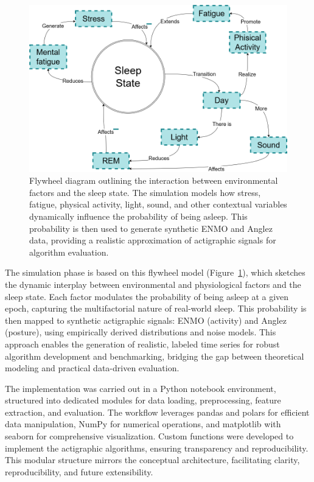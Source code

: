 \documentclass[conference]{IEEEtran}
\begin{document}
\begin{figure}[htbp]
	\centering
	\includegraphics[width=0.85\columnwidth]{simulation.png}
	\caption{Flywheel diagram outlining the interaction between environmental factors and the sleep state. The simulation models how stress, fatigue, physical activity, light, sound, and other contextual variables dynamically influence the probability of being asleep. This probability is then used to generate synthetic ENMO and Anglez data, providing a realistic approximation of actigraphic signals for algorithm evaluation.}
	\label{fig:flywheel_simulation}
\end{figure}

The simulation phase is based on this flywheel model (Figure~\ref{fig:flywheel_simulation}), which sketches the dynamic interplay between environmental and physiological factors and the sleep state. Each factor modulates the probability of being asleep at a given epoch, capturing the multifactorial nature of real-world sleep. This probability is then mapped to synthetic actigraphic signals: ENMO (activity) and Anglez (posture), using empirically derived distributions and noise models. This approach enables the generation of realistic, labeled time series for robust algorithm development and benchmarking, bridging the gap between theoretical modeling and practical data-driven evaluation.

The implementation was carried out in a Python notebook environment, structured into dedicated modules for data loading, preprocessing, feature extraction, and evaluation. The workflow leverages pandas and polars for efficient data manipulation, NumPy for numerical operations, and matplotlib with seaborn for comprehensive visualization. Custom functions were developed to implement the actigraphic algorithms, ensuring transparency and reproducibility. This modular structure mirrors the conceptual architecture, facilitating clarity, reproducibility, and future extensibility.
\end{document}
